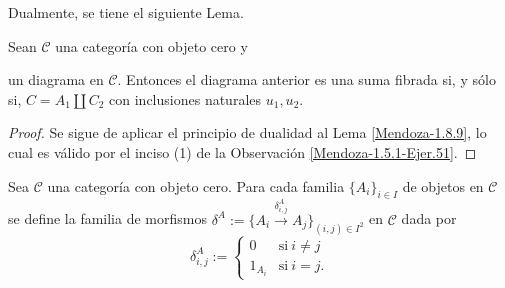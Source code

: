 \documentclass[tesis]{subfiles}
\begin{document}
\noindent Dualmente, se tiene el siguiente Lema.

\begin{Lema}\label{Mendoza-1.8.9*}
    Sean $\mathscr{C}$ una categoría con objeto cero y
    \begin{center}
    \end{center}
    un diagrama en $\mathscr{C}$. Entonces el diagrama anterior es una suma fibrada si, y sólo si, $C=A_1\coprod C_2$ con inclusiones naturales $u_1,u_2$.
\end{Lema}

\begin{proof}
    Se sigue de aplicar el principio de dualidad al Lema \ref{Mendoza-1.8.9}, lo cual es válido por el inciso (1) de la Observación \ref{Mendoza-1.5.1-Ejer.51}.
\end{proof}

\begin{Def}
    Sea $\mathscr{C}$ una categoría con objeto cero. Para cada familia $\{A_i\}_{i\in I}$ de objetos en $\mathscr{C}$ se define la familia de morfismos $\delta^A:=\big\{A_i\xrightarrow[]{\delta^A_{i,j}} A_j\big\}_{(i,j)\in I^2}$ en $\mathscr{C}$ dada por
    \[
        \delta^A_{i,j}:= \begin{cases} 0 &\text{si} \ i\neq j \\ 1_{A_i} &\text{si} \ i=j. \end{cases}
    \] 
\end{Def}
\end{document}
